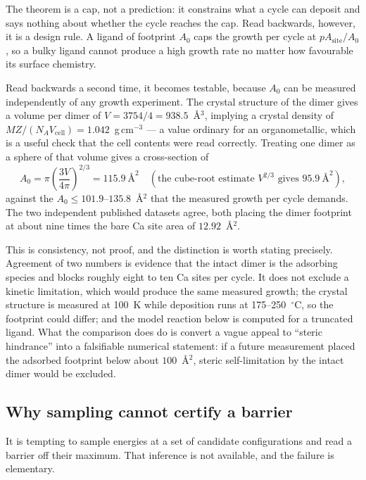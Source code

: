 The theorem is a cap, not a prediction: it constrains what a cycle can deposit
and says nothing about whether the cycle reaches the cap. Read backwards,
however, it is a design rule. A ligand of footprint $A_0$ caps the growth per
cycle at $pA_{\mathrm{site}}/A_0$, so a bulky ligand cannot produce a high
growth rate no matter how favourable its surface chemistry.

Read backwards a second time, it becomes testable, because $A_0$ can be
measured independently of any growth experiment. The crystal structure of the
dimer \citep{Kim2016} gives a volume per dimer of
$V=3754/4=938.5$~\AA$^3$, implying a crystal density of
$MZ/(N_A V_{\mathrm{cell}})=1.042$~g\,cm$^{-3}$ --- a value ordinary for an
organometallic, which is a useful check that the cell contents were read
correctly. Treating one dimer as a sphere of that volume gives a cross-section
of
\[
A_0 = \pi\left(\frac{3V}{4\pi}\right)^{2/3} = 115.9\ \text{\AA}^2
  \quad (\text{the cube-root estimate } V^{2/3} \text{ gives } 95.9\ \text{\AA}^2),
\]
against the $A_0\le101.9$--$135.8$~\AA$^2$ that the measured growth per cycle
demands. The two independent published datasets agree, both placing the dimer
footprint at about nine times the bare Ca site area of $12.92$~\AA$^2$.

\begin{remark}
This is consistency, not proof, and the distinction is worth stating precisely.
Agreement of two numbers is evidence that the intact dimer is the adsorbing
species and blocks roughly eight to ten Ca sites per cycle. It does not exclude
a kinetic limitation, which would produce the same measured growth; the crystal
structure is measured at 100~K while deposition runs at 175--250~$^\circ$C, so
the footprint could differ; and the model reaction below is computed for a
truncated ligand. What the comparison does do is convert a vague appeal to
``steric hindrance'' into a falsifiable numerical statement: if a future
measurement placed the adsorbed footprint below about $100$~\AA$^2$, steric
self-limitation by the intact dimer would be excluded.
\end{remark}

\subsection{Why sampling cannot certify a barrier}

It is tempting to sample energies at a set of candidate configurations and read
a barrier off their maximum. That inference is not available, and the failure
is elementary.

